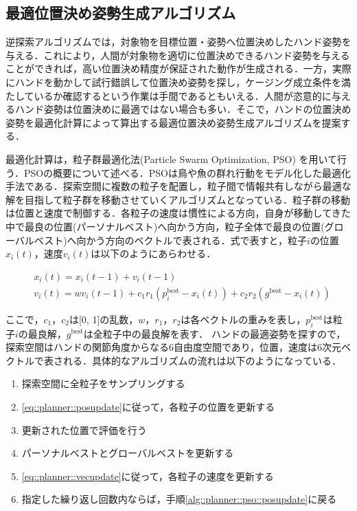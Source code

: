 \documentclass[a4paper,twoside,12pt,papersize, dvipdfmx]{iirthesis}
\begin{document}
\subsection{最適位置決め姿勢生成アルゴリズム}\label{subsec::planner::revoptimize}
逆探索アルゴリズムでは，対象物を目標位置・姿勢へ位置決めしたハンド姿勢を与える．これにより，人間が対象物を適切に位置決めできるハンド姿勢を与えることができれば，高い位置決め精度が保証された動作が生成される．一方，実際にハンドを動かして試行錯誤して位置決め姿勢を探し，ケージング成立条件を満たしているか確認するという作業は手間であるともいえる．人間が恣意的に与えるハンド姿勢は位置決めに最適ではない場合も多い．そこで，ハンドの位置決め姿勢を最適化計算によって算出する最適位置決め姿勢生成アルゴリズムを提案する．\par
最適化計算は，粒子群最適化法(Particle Swarm Optimization, PSO) \cite{kennedy1995}を用いて行う．PSOの概要について述べる．PSOは鳥や魚の群れ行動をモデル化した最適化手法である．探索空間に複数の粒子を配置し，粒子間で情報共有しながら最適な解を目指して粒子群を移動させていくアルゴリズムとなっている．粒子群の移動は位置と速度で制御する．各粒子の速度は慣性による方向，自身が移動してきた中で最良の位置(パーソナルベスト)へ向かう方向，粒子全体で最良の位置(グローバルベスト)へ向かう方向のベクトルで表される．式で表すと，粒子$i$の位置$x_i(t)$，速度$v_i(t)$は以下のようにあらわせる．

\begin{align}
&x_i(t) = x_i(t-1) + v_i(t-1) \label{eq::planner::posupdate} \\
&v_i(t) = wv_i(t-1) + c_1 r_1 (p^{\mathrm{best}}_i - x_i(t)) + c_2 r_2 (g^{\mathrm{best}}-x_i(t))\label{eq::planner::vecupdate}
\end{align}

ここで，$c_1$，$c_2$は[0, 1]の乱数，$w$，$r_1$，$r_2$は各ベクトルの重みを表し，$p^{\mathrm{best}}_i$は粒子$i$の最良解，$g^{\mathrm{best}}$は全粒子中の最良解を表す．
ハンドの最適姿勢を探すので，探索空間はハンドの関節角度からなる6自由度空間であり，位置，速度は6次元ベクトルで表される．具体的なアルゴリズムの流れは以下のようになっている．

\begin{enumerate}
\item 探索空間に全粒子をサンプリングする\label{alg::planner::pso::sampling}
\item \eqref{eq::planner::posupdate}に従って，各粒子の位置を更新する\label{alg::planner::pso::posupdate}
\item 更新された位置で評価を行う\label{alg::planner::pso::eval}
\item パーソナルベストとグローバルベストを更新する
\item \eqref{eq::planner::vecupdate}に従って，各粒子の速度を更新する
\item 指定した繰り返し回数内ならば，手順\ref{alg::planner::pso::posupdate}に戻る
\end{enumerate}
\end{document}
